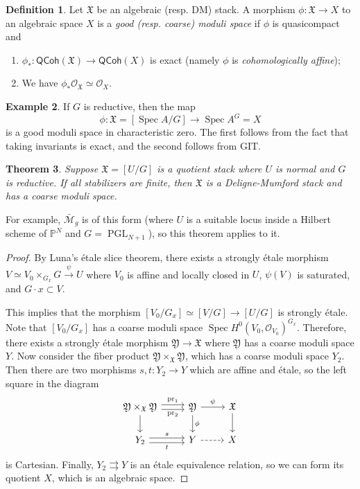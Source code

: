 \documentclass{amsart}
\newtheorem{thm}{Theorem}[section]
\theoremstyle{definition}
\newtheorem{defn}[thm]{Definition}
\newtheorem{exm}[thm]{Example}
\theoremstyle{remark}
\theoremstyle{plain}
\theoremstyle{definition}
\theoremstyle{remark}
\renewcommand{\P}{\mathbb{P}}
\newcommand{\mc}[1]{\mathcal{#1}}
\newcommand{\mf}[1]{\mathfrak{#1}}
\newcommand{\on}[1]{\operatorname{#1}}
\newcommand{\ms}[1]{\mathsf{#1}}
\newcommand{\1}{\mathbf{1}}
\newcommand{\2}{\mathbf{2}}
\newcommand{\3}{\mathbf{3}}
\DeclareMathOperator{\Spec}{Spec}
\begin{document}
\begin{defn}
    Let \(\mf{X}\) be an algebraic (resp. DM) stack. A morphism \(\phi \colon \mf{X} \to X\) to an algebraic space \(X\) is a \textit{good (resp. coarse) moduli space} if \(\phi\) is quasicompact and
    \begin{enumerate}
        \item \(\phi_* \colon \ms{QCoh}(\mf{X}) \to \ms{QCoh}(X)\) is exact (namely \(\phi\) is \textit{cohomologically affine});
        \item We have \(\phi_*\mc{O}_{\mf{X}} \simeq \mc{O}_X\).
    \end{enumerate}
\end{defn}

\begin{exm}
    If \(G\) is reductive, then the map
    \[ \phi \colon \mf{X} = [\Spec A / G] \to \Spec A^G = X \] 
    is a good moduli space in characteristic zero. The first follows from the fact that taking invariants is exact, and the second follows from GIT.
\end{exm}

\begin{thm}
    Suppose \(\mf{X} = [U/G]\) is a quotient stack where \(U\) is normal and \(G\) is reductive. If all stabilizers are finite, then \(\mf{X}\) is a Deligne-Mumford stack and has a coarse moduli space.
\end{thm}

For example, \(\bar{\mc{M}}_g\) is of this form (where \(U\) is a suitable locus inside a Hilbert scheme of \(\P^N\) and \(G = \on{PGL}_{N+1}\)), so this theorem applies to it.

\begin{proof}
    By Luna's \'etale slice theorem, there exists a strongly \'etale morphism \(V \simeq V_0 \times_{G_x} G \xrightarrow{\psi} U\) where \(V_0\) is affine and locally closed in \(U\), \(\psi(V)\) is saturated, and \(G \cdot x \subset V\).

    This implies that the morphism \([V_0 / G_x] \simeq [V/G] \to [U/G]\) is strongly \'etale. Note that \([V_0 / G_x]\) has a coarse moduli space \(\Spec H^0(V_0, \mc{O}_{V_0})^{G_x}\). Therefore, there exists a strongly \'etale morphism \(\mf{Y} \to \mf{X}\) where \(\mf{Y}\) has a coarse moduli space \(Y\). Now consider the fiber product \(\mf{Y} \times_{\mf{X}} \mf{Y}\), which has a coarse moduli space \(Y_2\). Then there are two morphisms \(s, t \colon Y_2 \to Y\) which are affine and \'etale, so the left square in the diagram
    \begin{equation*}
    \begin{tikzcd}
        \mf{Y} \times_{\mf{X}} \mf{Y} \ar[shift left]{r}{\on{pr}_1} \ar[shift right]{r}[swap]{\on{pr}_2} \ar{d} & \mf{Y} \ar{d}{\phi} \ar{r}{\psi} & \mf{X} \ar{d} \\
        Y_2 \ar[shift left]{r}{s} \ar[shift right]{r}[swap]{t} & Y \ar[dashrightarrow]{r} & X
    \end{tikzcd}
    \end{equation*}
    is Cartesian. Finally, \(Y_2 \rightrightarrows Y\) is an \'etale equivalence relation, so we can form its quotient \(X\), which is an algebraic space.
\end{proof}
\end{document}

